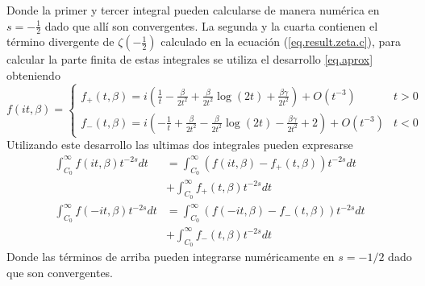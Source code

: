 Donde la primer y tercer integral pueden calcularse de manera numérica en $s= -\frac{1}{2}$ dado que allí son convergentes. La segunda y la cuarta contienen el término divergente de $\zeta \left(- \frac{1}{2} \right)$ calculado en la ecuación (\ref{eq.result.zeta.c}), para calcular la parte finita de estas integrales se utiliza el desarrollo \ref{eq.aprox} obteniendo
\[ 
f   ( i t ,\beta )=
\begin{cases} 
	  f _{+} ( t, \beta) = 
	  i  \left(
			\frac{1}{t} - \frac{\beta}{2 t ^2 } + \frac{\beta}{2 t^2}
			\log (2 t) + \frac{\beta \gamma}{2 t^2} 
			\right) + O (t ^{-3})
	  & t > 0 \\
	  f _{-} ( t, \beta) =
      i  \left(
			- \frac{1}{t} + \frac{\beta}{2 t ^2 } - \frac{\beta}{2 t^2}
			\log (2 t) - \frac{\beta \gamma}{2 t^2} +2
			\right) + O (t ^{-3})
      & t < 0
   \end{cases}   
\]
Utilizando este desarrollo las ultimas dos integrales pueden expresarse
\begin{align}
\nonumber
	\int _{C _0} ^{\infty}
			f (i t,\beta )
			t ^{-2s}  dt &= 
	\int _{C _0} ^{\infty}
		\left(
			f (it, \beta) - f _{+} (t, \beta )			
				\right) t ^{-2s} dt 
	\\ &+ 
\nonumber
	\int _{C _0} ^{\infty}
			f _{+} ( t, \beta)
			 t ^{-2s} dt  \\
\nonumber
	\int _{C _0} ^{\infty}
			f (-i t,\beta )
			t ^{-2s}  dt &= 
	\int _{C _0} ^{\infty}
		\left(
			f (-it, \beta) - f _{-} (t, \beta )			
				\right) t ^{-2s} dt 
	\\ &+ 
\nonumber
	\int _{C _0} ^{\infty}
			f _{-} ( t, \beta)
			 t ^{-2s} dt
\end{align}
Donde las términos de arriba pueden integrarse numéricamente en $s=-1/2$ dado que son convergentes. 

